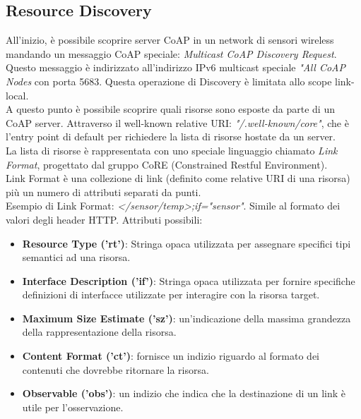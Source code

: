\documentclass{article}
\begin{document}
\subsection{Resource Discovery}
All'inizio, è possibile scoprire server CoAP in un network di sensori wireless mandando un messaggio CoAP speciale: \textit{Multicast CoAP Discovery Request}. Questo messaggio è indirizzato all'indirizzo IPv6 multicast speciale \textit{"All CoAP Nodes} con porta 5683. Questa operazione di Discovery è limitata allo scope link-local. \\ A questo punto è possibile scoprire quali risorse sono esposte da parte di un CoAP server. Attraverso il well-known relative URI: \textit{"/.well-known/core"}, che è l'entry point di default per richiedere la lista di risorse hostate da un server. \\ La lista di risorse è rappresentata con uno speciale linguaggio chiamato \textit{Link Format}, progettato dal gruppo CoRE (Constrained Restful Environment). \\ Link Format è una collezione di link (definito come relative URI di una risorsa) più un numero di attributi separati da punti. \\ Esempio di Link Format: \textit{</sensor/temp>;if="sensor"}. Simile al formato dei valori degli header HTTP. Attributi possibili:
\begin{itemize}
    \item \textbf{Resource Type ('rt')}: Stringa opaca utilizzata per assegnare specifici tipi semantici ad una risorsa.
    \item \textbf{Interface Description ('if')}: Stringa opaca utilizzata per fornire specifiche definizioni di interfacce utilizzate per interagire con la risorsa target.
    \item \textbf{Maximum Size Estimate ('sz')}: un'indicazione della massima grandezza della rappresentazione della risorsa.
    \item \textbf{Content Format ('ct')}: fornisce un indizio riguardo al formato dei contenuti che dovrebbe ritornare la risorsa.
    \item \textbf{Observable ('obs')}: un indizio che indica che la destinazione di un link è utile per l'osservazione. 
\end{itemize}
\end{document}
